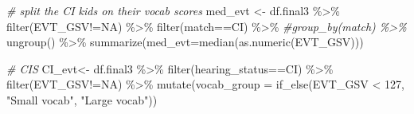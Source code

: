 \documentclass[
]{article}
\newenvironment{Shaded}{\begin{snugshade}}{\end{snugshade}}
\newcommand{\AttributeTok}[1]{\textcolor[rgb]{0.77,0.63,0.00}{#1}}
\newcommand{\CommentTok}[1]{\textcolor[rgb]{0.56,0.35,0.01}{\textit{#1}}}
\newcommand{\DecValTok}[1]{\textcolor[rgb]{0.00,0.00,0.81}{#1}}
\newcommand{\FunctionTok}[1]{\textcolor[rgb]{0.00,0.00,0.00}{#1}}
\newcommand{\NormalTok}[1]{#1}
\newcommand{\OtherTok}[1]{\textcolor[rgb]{0.56,0.35,0.01}{#1}}
\newcommand{\SpecialCharTok}[1]{\textcolor[rgb]{0.00,0.00,0.00}{#1}}
\newcommand{\StringTok}[1]{\textcolor[rgb]{0.31,0.60,0.02}{#1}}
\begin{document}
\begin{Shaded}
\begin{Highlighting}[]
\CommentTok{\# split the CI kids on their vocab scores}
\NormalTok{med\_evt }\OtherTok{\textless{}{-}}\NormalTok{ df.final3 }\SpecialCharTok{\%\textgreater{}\%}
  \FunctionTok{filter}\NormalTok{(EVT\_GSV}\SpecialCharTok{!=}\StringTok{\textquotesingle{}NA\textquotesingle{}}\NormalTok{) }\SpecialCharTok{\%\textgreater{}\%}
  \FunctionTok{filter}\NormalTok{(match}\SpecialCharTok{==}\StringTok{\textquotesingle{}CI\textquotesingle{}}\NormalTok{) }\SpecialCharTok{\%\textgreater{}\%}
  \CommentTok{\#group\_by(match) \%\textgreater{}\%}
  \FunctionTok{ungroup}\NormalTok{() }\SpecialCharTok{\%\textgreater{}\%}
  \FunctionTok{summarize}\NormalTok{(}\AttributeTok{med\_evt=}\FunctionTok{median}\NormalTok{(}\FunctionTok{as.numeric}\NormalTok{(EVT\_GSV)))}

\CommentTok{\# CIS}
\NormalTok{CI\_evt}\OtherTok{\textless{}{-}}\NormalTok{ df.final3 }\SpecialCharTok{\%\textgreater{}\%}
  \FunctionTok{filter}\NormalTok{(hearing\_status}\SpecialCharTok{==}\StringTok{\textquotesingle{}CI\textquotesingle{}}\NormalTok{) }\SpecialCharTok{\%\textgreater{}\%}
  \FunctionTok{filter}\NormalTok{(EVT\_GSV}\SpecialCharTok{!=}\StringTok{\textquotesingle{}NA\textquotesingle{}}\NormalTok{) }\SpecialCharTok{\%\textgreater{}\%}
  \FunctionTok{mutate}\NormalTok{(}\AttributeTok{vocab\_group =} \FunctionTok{if\_else}\NormalTok{(EVT\_GSV }\SpecialCharTok{\textless{}} \DecValTok{127}\NormalTok{, }
                            \StringTok{"Small vocab"}\NormalTok{, }
                            \StringTok{"Large vocab"}\NormalTok{))}


\end{Highlighting}
\end{Shaded}
\end{document}
